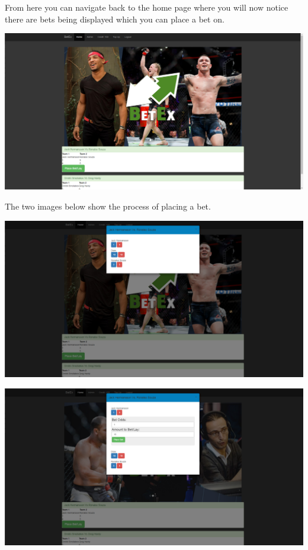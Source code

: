From here you can navigate back to the home page where you will now notice there are bets being displayed which you can place a bet on.

\includegraphics[width=\textwidth,height=\textheight,keepaspectratio]{img/screenshots/homeLoggedIn.png}

The two images below show the process of placing a bet.

\includegraphics[width=\textwidth,height=\textheight,keepaspectratio]{img/screenshots/placeBet.png}

\includegraphics[width=\textwidth,height=\textheight,keepaspectratio]{img/screenshots/placingBet.png}

